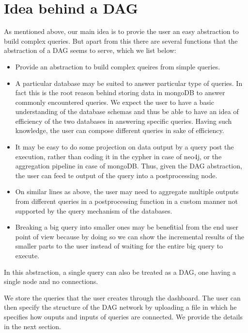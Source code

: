 \documentclass[letterpaper,10pt,english]{sphinxmanual}
\begin{document}
\section{Idea behind a DAG}
\label{\detokenize{dag:idea-behind-a-dag}}
As mentioned above, our main idea is to provie the user an easy abstraction to build complex queries. But apart from this there are several functions that the abstraction of a DAG seems to serve, which we list below:
\begin{itemize}
\item {} 
Provide an abstraction to build complex queires from simple queries.

\item {} 
A particular database may be suited to answer particular type of queries. In fact this is the root reason behind storing data in mongoDB to answer commonly encountered queries. We expect the user to have a basic understanding of the database schemas and thus be able to have an idea of efficiency of the two databases in answering specific queries. Having such knowledge, the user can compose different queries in sake of efficiency.

\item {} 
It may be easy to do some projection on data output by a query post the execution, rather than coding it in the cypher in case of neo4j, or the aggregation pipeline in case of mongoDB. Thus, given the DAG abstraction, the user can feed te output of the query into a postprocessing node.

\item {} 
On similar lines as above, the user may need to aggregate multiple outputs from different queries in a postprocessing function in a custom manner not supported by the query mechanism of the databases.

\item {} 
Breaking a big query into smaller ones may be benefitial from the end user point of view because by doing so we can show the incremental results of the smaller parts to the user instead of waiting for the entire big query to execute.

\end{itemize}

In this abstraction, a single query can also be treated as a DAG, one having a single node and no connections.

We store the queries that the user creates through the dashboard. The user can then specify the structure of the DAG network by uploading a file in which he specifies how ouputs and inputs of queries are connected. We provide the details in the next section.
\end{document}
